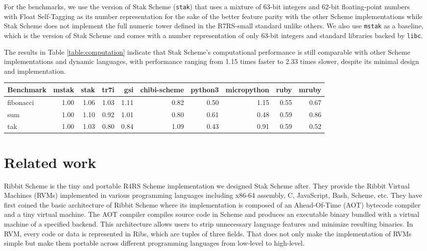 \documentclass[sigplan, anonymous, review]{acmart}
\begin{document}
For the benchmarks, we use the version of Stak Scheme (\texttt{stak})
that uses a
mixture of 63-bit integers and 62-bit floating-point numbers with Float
Self-Tagging \cite{floatselftag} as its number representation
for the sake of the better feature parity with
the other Scheme implementations while Stak Scheme does not implement
the full numeric tower defined in the R7RS-small standard unlike others.
We also use \texttt{mstak} as a baseline, which is the version of
Stak Scheme and comes with a number representation of only 63-bit
integers and standard libraries backed by \texttt{libc}.

The results in Table \ref{table:computation} indicate that Stak
Scheme's computational performance is still comparable with other
Scheme implementations and dynamic languages, with performance
ranging from 1.15 times faster to 2.33 times slower,
despite its minimal design and implementation.

\begin{table*}
  \begin{center}
    \caption{Computational benchmarks (relative time. lower is better.)}
    \label{table:computation}
    \begin{tabular}{l|rrrrrrrrr}
      \hline
      Benchmark & mstak & stak & tr7i & gsi & chibi-scheme & python3
      & micropython & ruby & mruby \\
      \hline
      fibonacci & 1.00 & 1.06 & 1.03 & 1.11 & 0.82 & 0.50 & 1.15 &
      0.55 & 0.67 \\
      sum & 1.00 & 1.10 & 0.92 & 1.01 & 0.80 & 0.61 & 0.48 & 0.59 & 0.86 \\
      tak & 1.00 & 1.03 & 0.80 & 0.84 & 1.09 & 0.43 & 0.91 & 0.59 & 0.52 \\
      \hline
    \end{tabular}
  \end{center}
\end{table*}

\section{Related work}

Ribbit Scheme \cite{ribbit2023} is the tiny and portable R4RS Scheme
implementation we designed Stak Scheme after. They provide
the Ribbit Virtual Machines (RVMs) implemented in various programming languages
including x86-64 assembly, C, JavaScript, Bash, Scheme, etc.
They have first coined the basic architecture of Ribbit Scheme
\cite{ribbit2021} where its implementation is composed of an
Ahead-Of-Time (AOT) bytecode compiler and a tiny virtual machine.
The AOT compiler compiles source code in Scheme and produces
an executable binary bundled with a virtual machine of a specified backend.
This architecture allows users to strip unnecessary language
features and minimize resulting binaries.
In RVM, every code or data is represented in
Ribs, which are tuples of three fields.
That does not only make the implementation of
RVMs simple but make them portable across different
programming languages from low-level to high-level.
\end{document}
